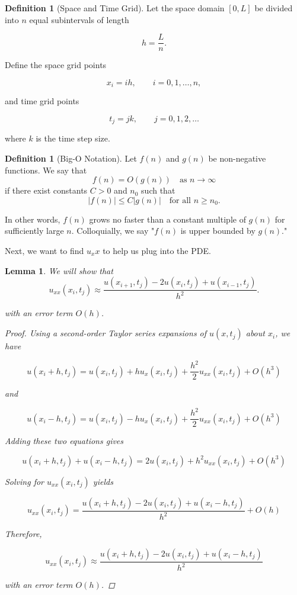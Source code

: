 \documentclass[12pt,letterpaper,reqno]{amsart}
\newtheorem{lem}[thm]{Lemma}
\theoremstyle{definition}
\newtheorem{Definition}[thm]{Definition}
\numberwithin{thm}{section}
\theoremstyle{remark}
\begin{document}
\begin{Definition}[Space and Time Grid] 
\label{def:grid}
Let the space domain $[0,L]$ be divided into $n$ equal subintervals of length

\[
h=\frac{L}{n}.
\]

Define the space grid points

\[
x_i = ih, \qquad i=0,1,\dots,n,
\]

and time grid points

\[
t_j = jk, \qquad j=0,1,2,\dots
\]

where $k$ is the time step size.
\end{Definition}

\begin{Definition}[Big-O Notation]
\label{def:bigO}
Let $f(n)$ and $g(n)$ be non-negative functions. We say that
\[
f(n) = O(g(n)) \quad \text{as } n \to \infty
\]
if there exist constants $C > 0$ and $n_0$ such that
\[
|f(n)| \le C|g(n)| \quad \text{for all } n \ge n_0.
\]

In other words, $f(n)$ grows no faster than a constant multiple of $g(n)$ for sufficiently large $n$. Colloquially, we say "$f(n)$ is upper bounded by $g(n)$."
\end{Definition}

Next, we want to find $u_xx$ to help us plug into the PDE. 

\begin{lem}
\label{lem:second_derivative}
We will show that
\[
u_{xx}(x_i,t_j) \approx \frac{u(x_{i+1},t_j)-2u(x_i,t_j)+u(x_{i-1},t_j)}{h^2}.
\]

with an error term $O(h)$. 

\begin{proof}
Using a second-order Taylor series expansions of $u(x,t_j)$ about $x_i$, we have

\[
u(x_i+h,t_j) =  u(x_i,t_j) + h u_x(x_i,t_j) + \frac{h^2}{2}u_{xx}(x_i,t_j) + O(h^3)
\]

and

\[
u(x_i-h,t_j) = u(x_i,t_j) - h u_x(x_i,t_j) + \frac{h^2}{2}u_{xx}(x_i,t_j) + O(h^3)
\]

Adding these two equations gives

\[
u(x_i+h,t_j)+u(x_i-h,t_j) = 2u(x_i,t_j) + h^2 u_{xx}(x_i,t_j) + O(h^3)
\]

Solving for $u_{xx}(x_i,t_j)$ yields

\[
u_{xx}(x_i,t_j) = \frac{u(x_i+h,t_j)-2u(x_i,t_j)+u(x_i-h,t_j)}{h^2} + O(h)
\]

Therefore, 

\[
u_{xx}(x_i,t_j) \approx \frac{u(x_i+h,t_j)-2u(x_i,t_j)+u(x_i-h,t_j)}{h^2}
\]

with an error term $O(h)$.
\end{proof}
\end{lem}
\end{document}
